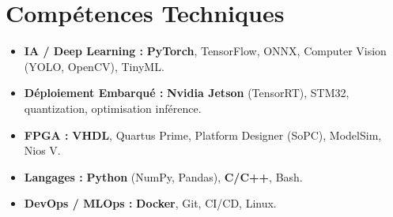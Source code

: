 \documentclass[a4paper,11pt]{article}
\begin{document}
\section{Compétences Techniques}
\begin{itemize}[leftmargin=*, nosep]
    \item \small{\textbf{IA / Deep Learning :} \textbf{PyTorch}, TensorFlow, ONNX, Computer Vision (YOLO, OpenCV), TinyML.}
    \item \small{\textbf{Déploiement Embarqué :} \textbf{Nvidia Jetson} (TensorRT), STM32, quantization, optimisation inférence.}
    \item \small{\textbf{FPGA :} \textbf{VHDL}, Quartus Prime, Platform Designer (SoPC), ModelSim, Nios V.}
    \item \small{\textbf{Langages :} \textbf{Python} (NumPy, Pandas), \textbf{C/C++}, Bash.}
    \item \small{\textbf{DevOps / MLOps :} \textbf{Docker}, Git, CI/CD, Linux.}
\end{itemize}

\end{document}
